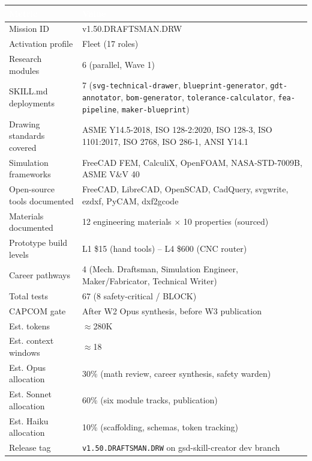 \documentclass[11pt,letterpaper]{article}
\newcommand{\tableheader}[1]{\textbf{\sffamily\textcolor{white}{#1}}}
\begin{document}
\begin{center}
\begin{tabularx}{\textwidth}{L{4cm}X}
\toprule
{}
\tableheader{Metric} & \tableheader{Value} \\
\midrule
Mission ID & v1.50.DRAFTSMAN.DRW \\
Activation profile & Fleet (17 roles) \\
Research modules & 6 (parallel, Wave 1) \\
SKILL.md deployments & 7 (\texttt{svg-technical-drawer}, \texttt{blueprint-generator}, \texttt{gdt-annotator}, \texttt{bom-generator}, \texttt{tolerance-calculator}, \texttt{fea-pipeline}, \texttt{maker-blueprint}) \\
Drawing standards covered & ASME Y14.5-2018, ISO 128-2:2020, ISO 128-3, ISO 1101:2017, ISO 2768, ISO 286-1, ANSI Y14.1 \\
Simulation frameworks & FreeCAD FEM, CalculiX, OpenFOAM, NASA-STD-7009B, ASME V\&V 40 \\
Open-source tools documented & FreeCAD, LibreCAD, OpenSCAD, CadQuery, svgwrite, ezdxf, PyCAM, dxf2gcode \\
Materials documented & 12 engineering materials $\times$ 10 properties (sourced) \\
Prototype build levels & L1 \$15 (hand tools) -- L4 \$600 (CNC router) \\
Career pathways & 4 (Mech. Draftsman, Simulation Engineer, Maker/Fabricator, Technical Writer) \\
Total tests & 67 (8 safety-critical / BLOCK) \\
CAPCOM gate & After W2 Opus synthesis, before W3 publication \\
Est. tokens & $\approx$280K \\
Est. context windows & $\approx$18 \\
Est. Opus allocation & 30\% (math review, career synthesis, safety warden) \\
Est. Sonnet allocation & 60\% (six module tracks, publication) \\
Est. Haiku allocation & 10\% (scaffolding, schemas, token tracking) \\
Release tag & \texttt{v1.50.DRAFTSMAN.DRW} on gsd-skill-creator dev branch \\
\bottomrule
\end{tabularx}
\end{center}
\end{document}

